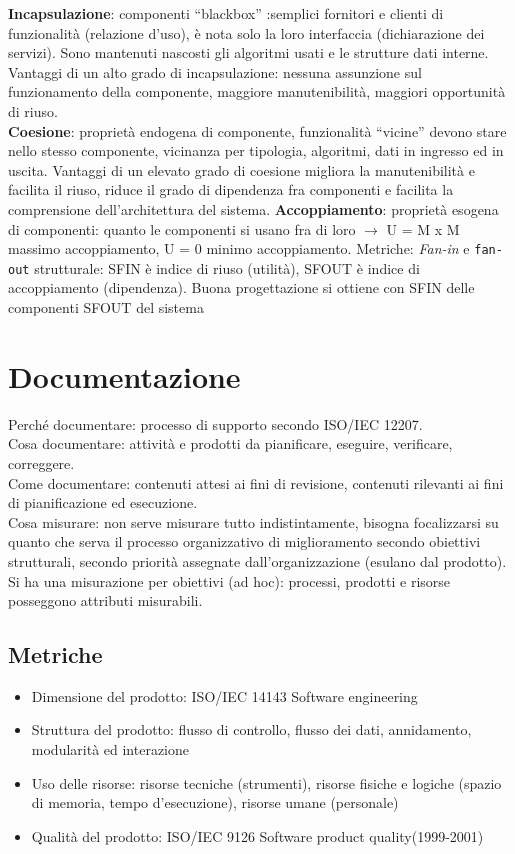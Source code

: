\textbf{Incapsulazione}: componenti ``blackbox'' :semplici fornitori e clienti di funzionalità (relazione d'uso), è nota solo la loro interfaccia (dichiarazione dei servizi). Sono mantenuti nascosti gli algoritmi usati e le strutture dati interne.\\
Vantaggi di un alto grado di incapsulazione: nessuna assunzione sul funzionamento della componente, maggiore manutenibilità, maggiori opportunità di riuso.\\
\textbf{Coesione}: proprietà endogena di componente, funzionalità ``vicine'' devono stare nello stesso componente, vicinanza per tipologia, algoritmi, dati in ingresso ed in uscita. Vantaggi di un elevato grado di coesione migliora la manutenibilità e facilita il riuso, riduce il grado di dipendenza fra componenti e facilita la comprensione dell'architettura del sistema.
\textbf{Accoppiamento}: proprietà esogena di componenti: quanto le componenti si usano fra di loro $\rightarrow$ U = M x M massimo accoppiamento, U = 0 minimo accoppiamento. Metriche: \textit{Fan-in} e \texttt{fan-out} strutturale: SFIN è indice di riuso (utilità), SFOUT è indice di accoppiamento (dipendenza). Buona progettazione si ottiene con SFIN delle componenti SFOUT del sistema

\section{Documentazione}
Perché documentare: processo di supporto secondo ISO/IEC 12207.\\
Cosa documentare: attività e prodotti da pianificare, eseguire, verificare, correggere.\\
Come documentare: contenuti attesi ai fini di revisione, contenuti rilevanti ai fini di pianificazione ed esecuzione.\\
Cosa misurare: non serve misurare tutto indistintamente, bisogna focalizzarsi su quanto che serva il processo organizzativo di miglioramento secondo obiettivi strutturali, secondo priorità assegnate dall'organizzazione (esulano dal prodotto). Si ha una misurazione per obiettivi (ad hoc): processi, prodotti e risorse posseggono attributi misurabili.

\subsection{Metriche}
\begin{itemize}
\item Dimensione del prodotto: ISO/IEC 14143 Software engineering
\item Struttura del prodotto: flusso di controllo, flusso dei dati, annidamento, modularità ed interazione
\item Uso delle risorse: risorse tecniche (strumenti), risorse fisiche e logiche (spazio di memoria, tempo d'esecuzione), risorse umane (personale)
\item Qualità del prodotto: ISO/IEC 9126 Software product quality(1999-2001)
\end{itemize}

